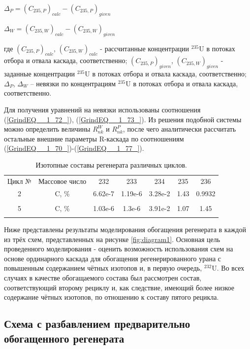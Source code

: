 $\Delta_{P} = {(C_{235, P})}_{calc}-{(C_{235, P})}_{given}$

$\Delta_{W} = {(C_{235, W})}_{calc}-{(C_{235, W})}_{given}$

где ${(C_{235, P})}_{calc}$, ${(C_{235, W})}_{calc}$ - рассчитанные концентрации $^{235}$U в потоках отбора и отвала каскада, соответственно; ${(C_{235, P})}_{given}$, ${(C_{235, W})}_{given}$ - заданные концентрации $^{235}$U в потоках отбора и отвала каскада, соответственно; $\Delta_{P}$, $\Delta_{W}$ -- невязки по концентрациям $^{235}$U в потоках отбора и отвала каскада, соответственно. 

Для получения уравнений на невязки использованы соотношения (\ref{GrindEQ__1_72_}), (\ref{GrindEQ__1_73_}). Из решения подобной системы можно определить величины $R_{n k}^{W}$ и $R_{n k}^{P}$, после чего аналитически рассчитать остальные внешние параметры R-каскада по соотношениям (\ref{GrindEQ__1_70_})-(\ref{GrindEQ__1_77_}).   



\begin{table}[h]
  \centering
  \normalsize\begin{tabulary}{1.0\textwidth}{CCCCCCC}
  Цикл № & Массовое число & 232 & 233 & 234 & 235 & 236 \\
  2 & C, \% & 6.62e-7 & 1.19e-6 &    3.28e-2 & 1.43 & 0.9932 \\
   &  &  &  &  &  &  \\
  5 & C, \% &  1.03e-6 &   1.3e-6 &  3.91e-2 & 1.07 & 1.45 \\
   &  &  &  &  &  &  \\
  \end{tabulary}
  \caption{{Изотопные составы регенерата различных циклов.{\label{is_compositions_2_5}}}}
\end{table}


Ниже представлены результаты моделирования обогащения регенерата в каждой из трёх схем, представленных на рисунке \ref{fig:diagram1}. 
Основная цель проведенного моделирования - оценить возможность использования схем на основе ординарного каскада для обогащения регенерированного урана с повышенным содержанием чётных изотопов и, в первую очередь, $^{232}$U. Во всех случаях в качестве обогащаемого состава был рассмотрен состав, соответствующий второму рециклу и, как следствие, имеющий более низкое содержание чётных изотопов, по отношению к составу пятого рецикла.

\subsection{Схема с разбавлением предварительно обогащенного регенерата}

